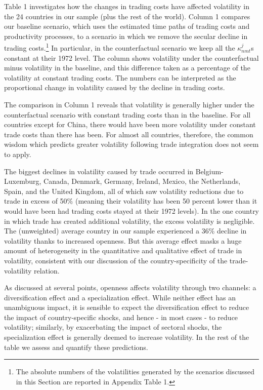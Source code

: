 \documentclass[12pt]{article}
\begin{document}
Table 1 investigates how the changes in trading costs have affected
volatility in the 24 countries in our sample (plus the rest of the world).
Column 1 compares our baseline scenario, which uses the estimated time paths
of trading costs and productivity processes, to a scenario in which we
remove the secular decline in trading costs.\footnote{%
The absolute numbers of the volatilities generated by the scenarios
discussed in this Section are reported in Appendix Table 1.} In particular,
in the counterfactual scenario we keep all the $\kappa _{nmt}^{j}$s constant
at their 1972 level. The column shows volatility under the counterfactual
minus volatility in the baseline, and this difference taken as a percentage
of the volatility at constant trading costs. The numbers can be interpreted
as the proportional change in volatility caused by the decline in trading
costs.

The comparison in Column 1 reveals that volatility is generally higher under
the counterfactual scenario with constant trading costs than in the
baseline. For all countries except for China, there would have been more
volatility under constant trade costs than there has been. For almost all
countries, therefore, the common wisdom which predicts greater volatility
following trade integration does not seem to apply.

The biggest declines in volatility caused by trade occurred in
Belgium-Luxemburg, Canada, Denmark, Germany, Ireland, Mexico, the
Netherlands, Spain, and the United Kingdom, all of which saw volatility
reductions due to trade in excess of 50\% (meaning their volatility has been
50 percent lower than it would have been had trading costs stayed at their
1972 levels). In the one country in which trade has created additional
volatility, the excess volatility is negligible. The (unweighted) average
country in our sample experienced a 36\% decline in volatility thanks to
increased openness. But this average effect masks a huge amount of
heterogeneity in the quantitative and qualitative effect of trade in
volatility, consistent with our discussion of the country-specificity of the
trade-volatility relation.

As discussed at several points, openness affects volatility through two
channels: a diversification effect and a specialization effect. While
neither effect has an unambiguous impact, it is sensible to expect the
diversification effect to reduce the impact of country-specific shocks, and
hence - in most cases - to reduce volatility; similarly, by exacerbating the
impact of sectoral shocks, the specialization effect is generally deemed to
increase volatility. In the rest of the table we assess and quantify these
predictions.
\end{document}
